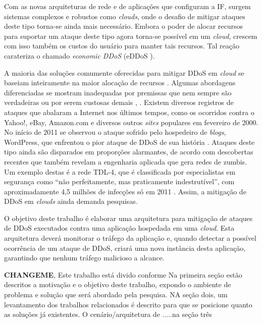 Com as novas arquiteturas de rede e de aplicações que configuram a IF, surgem sistemas complexos e robustos como \emph{clouds}, onde o desafio de mitigar ataques deste tipo torna-se ainda mais necessário.  Embora o poder de
alocar recursos para suportar um ataque deste tipo  agora torna-se
possível em um \emph{cloud}, crescem com isso também os custos do usuário para manter tais recursos. Tal reação
carateriza o chamado \emph{economic DDoS} (eDDoS \cite{Soon:10}).
  
A maioria das soluções comumente oferecidas para mitigar DDoS em \emph{cloud} se baseiam inteiramente na maior alocação de
recursos \cite{Peng:2007:SND:1216370.1216373}.  %
%
Algumas abordagens diferenciadas se mostram inadequadas por premissas que nem sempre são verdadeiras ou por serem custosas demais \cite{Bakshi:10}, \cite{Liu:2010:NFD:1866835.1866849}.
Existem diversos registros de ataques que abalaram a Internet nos últimos tempos, como os ocorridos contra o Yahoo!, eBay, Amazon.com e diversos outros \emph{sites} populares em fevereiro de 2000.  No início de 2011 se observou o ataque sofrido pelo hospedeiro de \emph{blogs}, WordPress, que enfrentou o pior ataque de DDoS de sua história \cite{infoexame}. Ataques deste tipo ainda são disparados em proporções alarmantes, de acordo com descobertas recentes que também revelam a engenharia aplicada que gera redes de zumbis. Um exemplo destas é a rede TDL-4, que é classificada por especialistas em segurança como “não perfeitamente, mas praticamente indestrutível”, com aproximadamente 4,5 milhões de infecções só em 2011 \cite{tdl4}. Assim, a mitigação de DDoS em \emph{clouds} ainda demanda pesquisas.

O objetivo deste trabalho é elaborar uma arquitetura para mitigação de ataques de
DDoS executados contra uma aplicação hospedada em uma \emph{cloud}. Esta
arquitetura deverá monitorar o tráfego da aplicação e, quando
detectar a possível ocorrência de um ataque de DDoS, criará uma nova
instância desta aplicação, garantindo que nenhum tráfego malicioso a alcance. 

\textbf{CHANGEME},
Este trabalho está divido conforme 
Na primeira seção estão descritos a motivação e o objetivo deste trabalho, expondo o ambiente de problema e solução que será abordado pela pesquisa. NA seção dois, um levantamento dos trabalhos relacionados é descrito para que se posicione quanto as soluções já existentes. O cenário/arquitetura de .....na seção três

%
%
